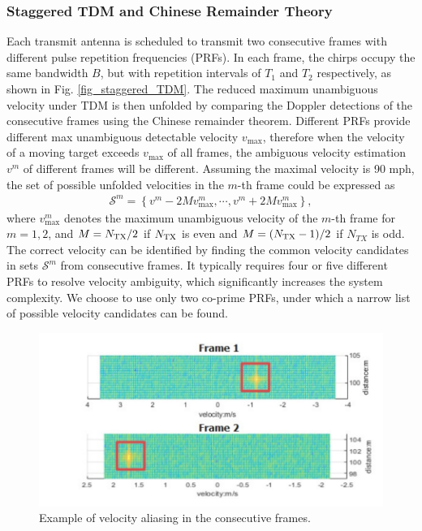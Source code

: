 \documentclass[conference]{IEEEtran}
\begin{document}
\subsubsection{Staggered TDM and Chinese Remainder Theory}
Each transmit antenna is scheduled to transmit two consecutive frames with different pulse repetition frequencies (PRFs). In each frame, the chirps occupy the same bandwidth $B$, but with repetition intervals of $T_1$ and $T_2$ respectively, as shown in Fig. \ref{fig_staggered_TDM}. The reduced maximum unambiguous velocity under TDM is then unfolded  by comparing the Doppler detections of the consecutive frames using the Chinese remainder theorem. Different PRFs provide different max unambiguous detectable velocity $v_{\max}$, therefore when the velocity of a moving target exceeds $v_{\max}$ of all frames, the ambiguous velocity estimation $v^m$ of different frames will be different. Assuming the maximal velocity is 90 mph, the set of possible unfolded velocities in the $m$-th frame  could be expressed as 
\begin{align}
{\mathcal S }^m = \left\{ {v^m - 2Mv_{\max }^m, \cdots ,v^m + 2Mv_{\max }^m} \right\}, 
\end{align}
where $v_{\max }^m$ denotes the maximum unambiguous velocity of the $m$-th frame for $m=1,2$, and $M = {{{N_{\rm TX}}} \mathord{\left/
 {\vphantom {{{N_{\rm TX}}} 2}} \right.
 \kern-\nulldelimiterspace} 2}$ if ${{N_{\rm TX}}}$ is even and $M = {{\left( {{N_{\rm TX}} - 1} \right)} \mathord{\left/
 {\vphantom {{\left( {{N_{\rm TX}} - 1} \right)} 2}} \right.
 \kern-\nulldelimiterspace} 2}$ if ${{N_{TX}}}$ is odd. 
The correct velocity can be identified by finding the common velocity candidates in sets ${\mathcal S}^m$ from  consecutive frames. It typically requires four or five different PRFs to resolve velocity ambiguity, which significantly increases the system complexity. We choose to use only two co-prime PRFs, under which a narrow list of possible velocity candidates can be found.
\vspace{-2mm}
\begin{figure}[h]
\centering
\includegraphics[width=2.5 in]{pic/crt.pdf}
\vspace{-2mm}
\caption{\label{fig_velocity_ambiguity}  Example of velocity aliasing in the consecutive frames. }
\end{figure}
\vspace{-2mm}
\end{document}

